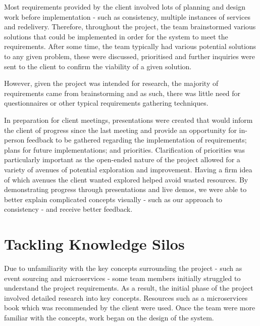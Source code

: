 \documentclass{l3proj}
\begin{document}
Most requirements provided by the client involved lots of planning and design work before implementation - such as consistency, multiple instances of services and redelivery. Therefore, throughout the project, the team brainstormed various solutions that could be implemented in order for the system to meet the requirements. After some time, the team typically had various potential solutions to any given problem, these were discussed, prioritised and further inquiries were sent to the client to confirm the viability of a given solution.

However, given the project was intended for research, the majority of requirements came from brainstorming and as such, there was little need for questionnaires or other typical requirements gathering techniques.

In preparation for client meetings, presentations were created that would inform the client of progress since the last meeting and provide an opportunity for in-person feedback to be gathered regarding the implementation of requirements; plans for future implementations; and priorities. Clarification of priorities was particularly important as the open-ended nature of the project allowed for a variety of avenues of potential exploration and improvement. Having a firm idea of which avenues the client wanted explored helped avoid wasted resources. By demonstrating progress through presentations and live demos, we were able to better explain complicated concepts visually - such as our approach to consistency - and receive better feedback.

\section{Tackling Knowledge Silos}
\label{sec:knowledge-silos}
Due to unfamiliarity with the key concepts surrounding the project - such as event sourcing and microservices - some team members initially struggled to understand the project requirements. As a result, the initial phase of the project involved detailed research into key concepts. Resources such as a microservices book \cite{microservices} which was recommended by the client were used. Once the team were more familiar with the concepts, work began on the design of the system.
\end{document}
